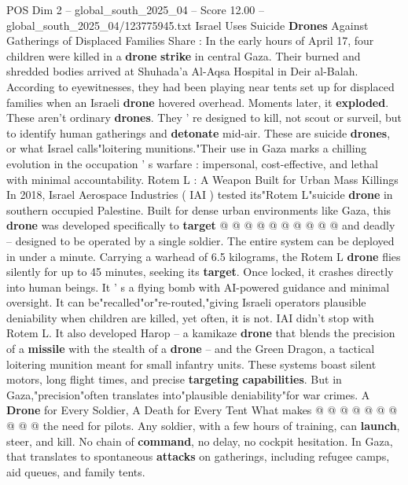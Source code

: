 \begin{textsample}{POS Dim 2 – global\_south\_2025\_04 – Score 12.00 – global\_south\_2025\_04/123775945.txt}  \label{ex:f2_pos_349}
Israel Uses Suicide \textbf{Drones} Against Gatherings of Displaced Families Share : In the early hours of April 17, four children were killed in a \textbf{drone} \textbf{strike} in central Gaza.
Their burned and shredded bodies arrived at Shuhada'a Al-Aqsa Hospital in Deir al-Balah.
According to eyewitnesses, they had been playing near tents set up for displaced families when an Israeli \textbf{drone} hovered overhead.
Moments later, it \textbf{exploded}.
These aren't ordinary \textbf{drones}.
They ' re designed to kill, not scout or surveil, but to identify human gatherings and \textbf{detonate} mid-air.
These are suicide \textbf{drones}, or what Israel calls"loitering munitions."Their use in Gaza marks a chilling evolution in the occupation ' s warfare : impersonal, cost-effective, and lethal with minimal accountability.
Rotem L : A Weapon Built for Urban Mass Killings In 2018, Israel Aerospace Industries ( IAI ) tested its"Rotem L"suicide \textbf{drone} in southern occupied Palestine.
Built for dense urban environments like Gaza, this \textbf{drone} was developed specifically to \textbf{target} @ @ @ @ @ @ @ @ @ @ and deadly -- designed to be operated by a single soldier.
The entire system can be deployed in under a minute.
Carrying a warhead of 6.5 kilograms, the Rotem L \textbf{drone} flies silently for up to 45 minutes, seeking its \textbf{target}.
Once locked, it crashes directly into human beings.
It ' s a flying bomb with AI-powered guidance and minimal oversight.
It can be"recalled"or"re-routed,"giving Israeli operators plausible deniability when children are killed, yet often, it is not.
IAI didn't stop with Rotem L.
It also developed Harop -- a kamikaze \textbf{drone} that blends the precision of a \textbf{missile} with the stealth of a \textbf{drone} -- and the Green Dragon, a tactical loitering munition meant for small infantry units.
These systems boast silent motors, long flight times, and precise \textbf{targeting} \textbf{capabilities}.
But in Gaza,"precision"often translates into"plausible deniability"for war crimes.
A \textbf{Drone} for Every Soldier, A Death for Every Tent What makes @ @ @ @ @ @ @ @ @ @ the need for pilots.
Any soldier, with a few hours of training, can \textbf{launch}, steer, and kill.
No chain of \textbf{command}, no delay, no cockpit hesitation.
In Gaza, that translates to spontaneous \textbf{attacks} on gatherings, including refugee camps, aid queues, and family tents.

\end{textsample}
